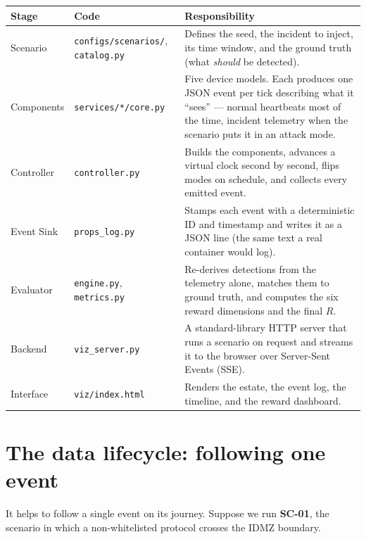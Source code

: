 \documentclass[11pt]{article}
\newcommand{\file}[1]{\textcolor{mfpurple}{\texttt{\small #1}}}
\begin{document}
\begin{longtable}{>{\RaggedRight\arraybackslash}p{2.6cm} >{\RaggedRight\arraybackslash}p{3.4cm} >{\RaggedRight\arraybackslash}p{7.4cm}}
\toprule
\textbf{Stage} & \textbf{Code} & \textbf{Responsibility}\\
\midrule
\endhead
Scenario & \file{configs/scenarios/}, \file{catalog.py}
  & Defines the seed, the incident to inject, its time window, and the ground
    truth (what \emph{should} be detected).\\
Components & \file{services/*/core.py}
  & Five device models. Each produces one JSON event per tick describing what it
    ``sees'' --- normal heartbeats most of the time, incident telemetry when the
    scenario puts it in an attack mode.\\
Controller & \file{controller.py}
  & Builds the components, advances a virtual clock second by second, flips modes
    on schedule, and collects every emitted event.\\
Event Sink & \file{props\_log.py}
  & Stamps each event with a deterministic ID and timestamp and writes it as a
    JSON line (the same text a real container would log).\\
Evaluator & \file{engine.py}, \file{metrics.py}
  & Re-derives detections from the telemetry alone, matches them to ground truth,
    and computes the six reward dimensions and the final $R$.\\
Backend & \file{viz\_server.py}
  & A standard-library HTTP server that runs a scenario on request and streams it
    to the browser over Server-Sent Events (SSE).\\
Interface & \file{viz/index.html}
  & Renders the estate, the event log, the timeline, and the reward dashboard.\\
\bottomrule
\end{longtable}

\section{The data lifecycle: following one event}
\label{sec:lifecycle}

It helps to follow a single event on its journey. Suppose we run \textbf{SC-01},
the scenario in which a non-whitelisted protocol crosses the IDMZ boundary.
\end{document}

